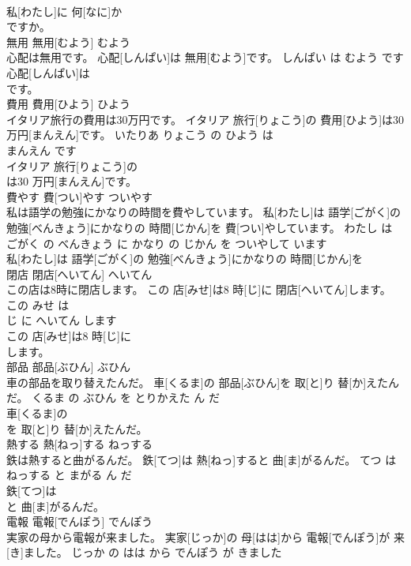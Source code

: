 \documentclass[8pt]{extreport}
\begin{document}
\begin{CJK}{UTF8}{min}
\\	私[わたし]に 何[なに]か
\\	ですか。			
\\	無用	無用[むよう]	むよう	
\\	心配は無用です。	心配[しんぱい]は 無用[むよう]です。	しんぱい は むよう です	
\\	心配[しんぱい]は
\\	です。			
\\	費用	費用[ひよう]	ひよう	
\\	イタリア旅行の費用は30万円です。	イタリア 旅行[りょこう]の 費用[ひよう]は30 万円[まんえん]です。	いたりあ りょこう の ひよう は 
\\	まんえん です	
\\	イタリア 旅行[りょこう]の
\\	は30 万円[まんえん]です。			
\\	費やす	費[つい]やす	ついやす	
\\	私は語学の勉強にかなりの時間を費やしています。	私[わたし]は 語学[ごがく]の 勉強[べんきょう]にかなりの 時間[じかん]を 費[つい]やしています。	わたし は ごがく の べんきょう に かなり の じかん を ついやして います	
\\	私[わたし]は 語学[ごがく]の 勉強[べんきょう]にかなりの 時間[じかん]を
\\	閉店	閉店[へいてん]	へいてん	
\\	この店は8時に閉店します。	この 店[みせ]は8 時[じ]に 閉店[へいてん]します。	この みせ は 
\\	じ に へいてん します	
\\	この 店[みせ]は8 時[じ]に
\\	します。			
\\	部品	部品[ぶひん]	ぶひん	
\\	車の部品を取り替えたんだ。	車[くるま]の 部品[ぶひん]を 取[と]り 替[か]えたんだ。	くるま の ぶひん を とりかえた ん だ	
\\	車[くるま]の
\\	を 取[と]り 替[か]えたんだ。			
\\	熱する	熱[ねっ]する	ねっする	
\\	鉄は熱すると曲がるんだ。	鉄[てつ]は 熱[ねっ]すると 曲[ま]がるんだ。	てつ は ねっする と まがる ん だ	
\\	鉄[てつ]は
\\	と 曲[ま]がるんだ。			
\\	電報	電報[でんぽう]	でんぽう	
\\	実家の母から電報が来ました。	実家[じっか]の 母[はは]から 電報[でんぽう]が 来[き]ました。	じっか の はは から でんぽう が きました	

\end{CJK}
\end{document}
